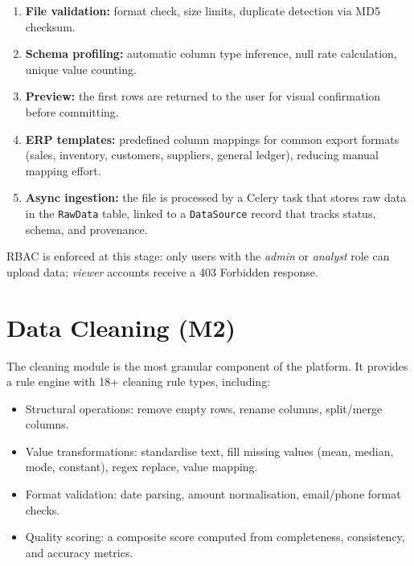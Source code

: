 \begin{enumerate}
  \item \textbf{File validation:} format check, size limits,
        duplicate detection via MD5 checksum.
  \item \textbf{Schema profiling:} automatic column type inference,
        null rate calculation, unique value counting.
  \item \textbf{Preview:} the first rows are returned to the user
        for visual confirmation before committing.
  \item \textbf{ERP templates:} predefined column mappings
        for common export formats (sales, inventory,
        customers, suppliers, general ledger),
        reducing manual mapping effort.
  \item \textbf{Async ingestion:} the file is processed
        by a Celery task that stores raw data
        in the \texttt{RawData} table,
        linked to a \texttt{DataSource} record
        that tracks status, schema, and provenance.
\end{enumerate}

\noindent
RBAC is enforced at this stage:
only users with the \textit{admin} or \textit{analyst}
role can upload data; \textit{viewer} accounts
receive a 403 Forbidden response.


\section{Data Cleaning (M2)}

\noindent
The cleaning module is the most granular
component of the platform.
It provides a rule engine with 18+ cleaning rule types,
including:

\begin{itemize}
  \item Structural operations: remove empty rows,
        rename columns, split/merge columns.
  \item Value transformations: standardise text,
        fill missing values (mean, median, mode, constant),
        regex replace, value mapping.
  \item Format validation: date parsing,
        amount normalisation, email/phone format checks.
  \item Quality scoring: a composite score
        computed from completeness, consistency,
        and accuracy metrics.
\end{itemize}

